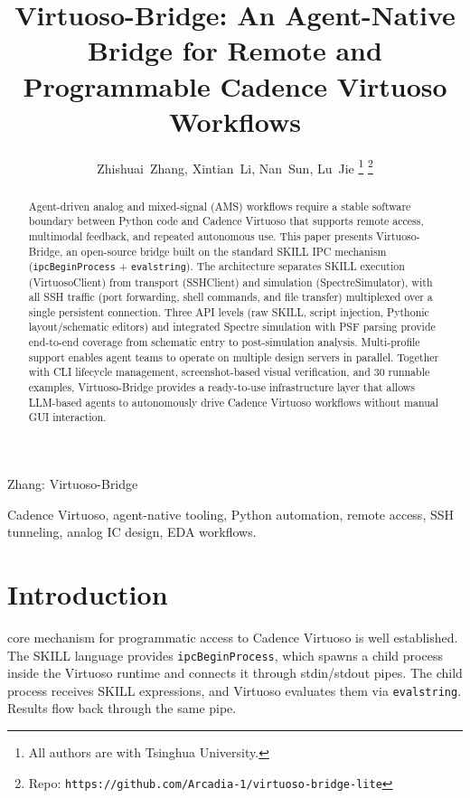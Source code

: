 \documentclass[lettersize,journal]{ieee_template/IEEEtran}
\begin{document}
\title{Virtuoso-Bridge: An Agent-Native Bridge for Remote and Programmable Cadence Virtuoso Workflows}

\author{Zhishuai~Zhang, Xintian~Li, Nan~Sun, Lu~Jie%
\thanks{All authors are with Tsinghua University.}%
\thanks{Repo: \texttt{https://github.com/Arcadia-1/virtuoso-bridge-lite}}%
}

\markboth{}%
{Zhang: Virtuoso-Bridge}

\maketitle

\begin{abstract}
Agent-driven analog and mixed-signal (AMS) workflows require a stable software boundary between Python code and Cadence Virtuoso that supports remote access, multimodal feedback, and repeated autonomous use. This paper presents Virtuoso-Bridge, an open-source bridge built on the standard SKILL IPC mechanism (\texttt{ipcBeginProcess} + \texttt{evalstring}). The architecture separates SKILL execution (VirtuosoClient) from transport (SSHClient) and simulation (SpectreSimulator), with all SSH traffic (port forwarding, shell commands, and file transfer) multiplexed over a single persistent connection. Three API levels (raw SKILL, script injection, Pythonic layout/schematic editors) and integrated Spectre simulation with PSF parsing provide end-to-end coverage from schematic entry to post-simulation analysis. Multi-profile support enables agent teams to operate on multiple design servers in parallel. Together with CLI lifecycle management, screenshot-based visual verification, and 30 runnable examples, Virtuoso-Bridge provides a ready-to-use infrastructure layer that allows LLM-based agents to autonomously drive Cadence Virtuoso workflows without manual GUI interaction.
\end{abstract}

\begin{IEEEkeywords}
Cadence Virtuoso, agent-native tooling, Python automation, remote access, SSH tunneling, analog IC design, EDA workflows.
\end{IEEEkeywords}

\section{Introduction}
 core mechanism for programmatic access to Cadence Virtuoso is well established. The SKILL language provides \texttt{ipcBeginProcess}, which spawns a child process inside the Virtuoso runtime and connects it through stdin/stdout pipes. The child process receives SKILL expressions, and Virtuoso evaluates them via \texttt{evalstring}. Results flow back through the same pipe.
\end{document}
